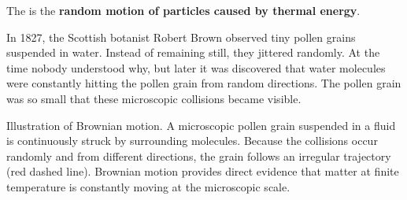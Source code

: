\highspace
\begin{examplebox}
    The  is the \textbf{random motion of particles caused by thermal energy}.

    \highspace
    In 1827, the Scottish botanist Robert Brown observed tiny pollen grains suspended in water. Instead of remaining still, they jittered randomly. At the time nobody understood why, but later it was discovered that water molecules were constantly hitting the pollen grain from random directions. The pollen grain was so small that these microscopic collisions became visible.

    \highspace\begin{center}

        Illustration of Brownian motion. A microscopic pollen grain suspended in a fluid is continuously struck by surrounding molecules. Because the collisions occur randomly and from different directions, the grain follows an irregular trajectory (red dashed line). Brownian motion provides direct evidence that matter at finite temperature is constantly moving at the microscopic scale.
    \end{center}


\end{examplebox}
